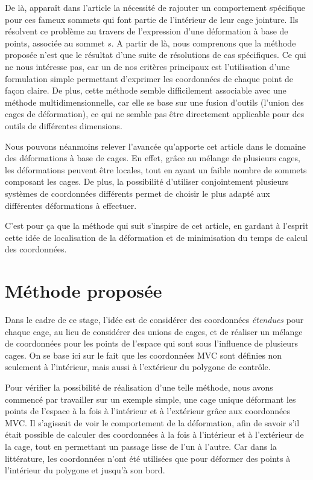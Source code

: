 De là, apparaît dans l'article la nécessité de rajouter un
comportement spécifique pour ces fameux sommets qui font partie de
l'intérieur de leur cage jointure. Ils résolvent ce problème au
travers de l'expression d'une déformation à base de points, associée
au sommet $s$. A partir de là, nous comprenons que la méthode proposée
\cite{GPCP13} n'est que le résultat d'une suite de résolutions de cas
spécifiques. Ce qui ne nous intéresse pas, car un de nos critères
principaux est l'utilisation d'une formulation simple permettant
d'exprimer les coordonnées de chaque point de façon claire. De plus,
cette méthode semble difficilement associable avec une méthode
multidimensionnelle, car elle se base sur une fusion d'outils (l'union
des cages de déformation), ce qui ne semble pas être directement
applicable pour des outils de différentes dimensions.

Nous pouvons néanmoins relever l'avancée qu'apporte cet article dans
le domaine des déformations à base de cages. En effet, grâce au
mélange de plusieurs cages, les déformations peuvent être locales,
tout en ayant un faible nombre de sommets composant les cages. De
plus, la possibilité d'utiliser conjointement plusieurs systèmes de
coordonnées différents permet de choisir le plus adapté aux
différentes déformations à effectuer.

C'est pour ça que la méthode qui suit s'inspire de cet article, en
gardant à l'esprit cette idée de localisation de la déformation et de
minimisation du temps de calcul des coordonnées.

\section{Méthode proposée}
Dans le cadre de ce stage, l'idée est de considérer des coordonnées
\textit{étendues} pour chaque cage, au lieu de considérer des unions
de cages, et de réaliser un mélange de coordonnées pour les points de
l'espace qui sont sous l'influence de plusieurs cages. On se base ici
sur le fait que les coordonnées MVC sont définies non seulement à
l'intérieur, mais aussi à l'extérieur du polygone de contrôle.

Pour vérifier la possibilité de réalisation d'une telle méthode, nous
avons commencé par travailler sur un exemple simple, une cage unique
déformant les points de l'espace à la fois à l'intérieur et à
l'extérieur grâce aux coordonnées MVC. Il s'agissait de voir le
comportement de la déformation, afin de savoir s'il était possible de
calculer des coordonnées à la fois à l'intérieur et à l'extérieur de
la cage, tout en permettant un passage lisse de l'un à l'autre. Car
dans la littérature, les coordonnées n'ont été utilisées que pour
déformer des points à l'intérieur du polygone et jusqu'à son bord.

